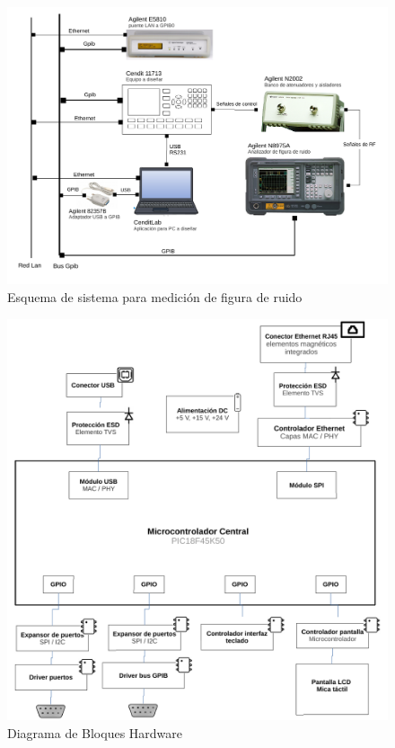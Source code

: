\documentclass[paper=letter,oneside,fontsize=11pt, parskip=full]{scrartcl}
\begin{document}
	\begin{figure}[!h]
		\begin{center}
			\includegraphics[width=17cm]{Imagenes/DiagramaBloquesSistema.pdf}
			\caption{Esquema de sistema para medición de figura de ruido}
			\label{Fig:SistemaMediciónFiguraRuido}
		\end{center}
	\end{figure}			
	
	


	\begin{figure}[!h]
		\begin{center}
			\includegraphics[width=18cm]{Imagenes/DiagramaBloquesHardware2.pdf}
			\caption{Diagrama de Bloques Hardware}
			\label{Fig:Diagrama de Bloques de Hardware}
		\end{center}
	\end{figure}
\end{document}
